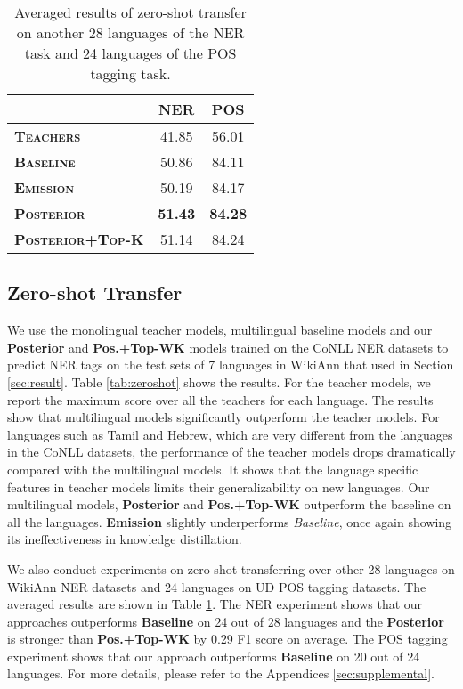 \documentclass[11pt,a4paper]{article}
\begin{document}
\begin{table}[t]
\centering
\small
\begin{tabular}{l|cc}
\hline\hline
& \textbf{NER} & \textbf{POS} \\
\hline
{\bf\textsc{Teachers}} & 41.85 & 56.01 \\
{\bf\textsc{Baseline}} & 50.86 & 84.11 \\
{\bf\textsc{Emission}} & 50.19 & 84.17 \\
{\bf\textsc{Posterior}} & \textbf{51.43} & \textbf{84.28} \\
{\bf\textsc{Posterior+Top-K}} & 51.14 & 84.24\\
\hline\hline
\end{tabular}
\caption{Averaged results of zero-shot transfer on another 28 languages of the NER task and 24 languages of the POS tagging task.}
\label{tab:averaged_zs}
\end{table}


\subsection{Zero-shot Transfer}
We use the monolingual teacher models, multilingual baseline models and our \textbf{Posterior} and \textbf{Pos.+Top-WK} models trained on the CoNLL NER datasets to predict NER tags on the test sets of 7 languages in WikiAnn that used in Section \ref{sec:result}. Table \ref{tab:zeroshot} shows the results. For the teacher models, we report the maximum score over all the teachers for each language. The results show that multilingual models significantly outperform the teacher models. For languages such as Tamil and Hebrew, which are very different from the languages in the CoNLL datasets, the performance of the teacher models drops dramatically compared with the multilingual models. It shows that the language specific features in teacher models limits their generalizability on new languages. Our multilingual models, \textbf{Posterior} and \textbf{Pos.+Top-WK} outperform the baseline on all the languages. \textbf{Emission} slightly underperforms \textit{Baseline}, once again showing its ineffectiveness in knowledge distillation. 

We also conduct experiments on zero-shot transferring over other 28 languages on WikiAnn NER datasets and 24 languages on UD POS tagging datasets. The averaged results are shown in Table \ref{tab:averaged_zs}. The NER experiment shows that our approaches outperforms \textbf{Baseline} on 24 out of 28 languages and the \textbf{Posterior} is stronger than \textbf{Pos.+Top-WK} by 0.29 F1 score on average. The POS tagging experiment shows that our approach outperforms \textbf{Baseline} on 20 out of 24 languages. For more details, please refer to the Appendices \ref{sec:supplemental}. 
\end{document}
